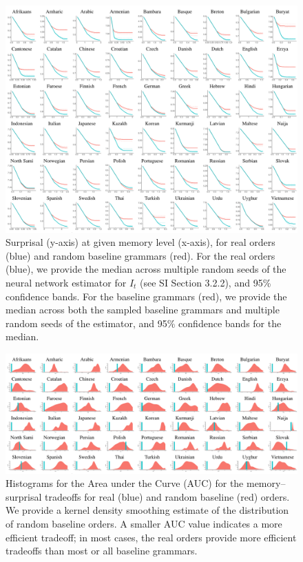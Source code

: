\begin{figure}
	\begin{center}
\includegraphics[width=\textwidth]{results-table.pdf}
\end{center}
	\caption{Surprisal (y-axis) at given memory level (x-axis), for real orders (blue) and random baseline grammars (red).
	For the real orders (blue), we provide the median across multiple random seeds of the neural network estimator for $I_t$ (see SI Section 3.2.2), and 95\% confidence bands.
	For the baseline grammars (red), we provide the median across both the sampled baseline grammars and multiple random seeds of the estimator, and 95\% confidence bands for the median.
}\label{fig:median-table-expt2}
\end{figure}


\begin{figure}
	\begin{center}
\includegraphics[width=\textwidth]{auc-table.pdf}
\end{center}
\caption{Histograms for the Area under the Curve (AUC) for the memory--surprisal tradeoffs for real (blue) and random baseline (red) orders.
We provide a kernel density smoothing estimate of the distribution of random baseline orders.
A smaller AUC value indicates a more efficient tradeoff; in most cases, the real orders provide more efficient tradeoffs than most or all baseline grammars.
}\label{fig:auc}
\end{figure}






